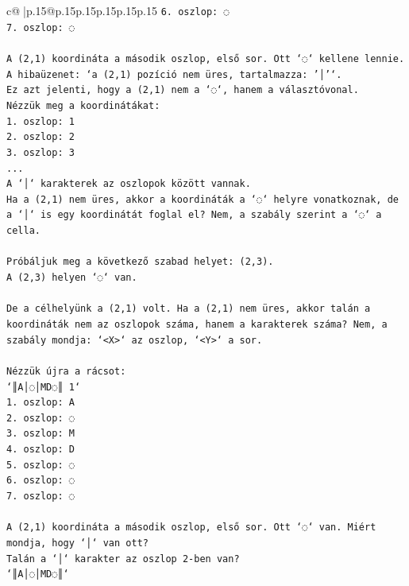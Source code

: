 \documentclass{article}
\begin{document}
{\begin{supertabular}{c@{$\;$}|p{.15\linewidth}@{}p{.15\linewidth}p{.15\linewidth}p{.15\linewidth}p{.15\linewidth}p{.15\linewidth}}
{{{\texttt{6. oszlop: ◌} \\
\texttt{7. oszlop: ◌} \\
\\ 
\texttt{A (2,1) koordináta a második oszlop, első sor. Ott `◌` kellene lennie.} \\
\texttt{A hibaüzenet: `a (2,1) pozíció nem üres, tartalmazza: '│'`.} \\
\texttt{Ez azt jelenti, hogy a (2,1) nem a `◌`, hanem a választóvonal.} \\
\texttt{Nézzük meg a koordinátákat:} \\
\texttt{1. oszlop: 1} \\
\texttt{2. oszlop: 2} \\
\texttt{3. oszlop: 3} \\
\texttt{...} \\
\texttt{A `│` karakterek az oszlopok között vannak.} \\
\texttt{Ha a (2,1) nem üres, akkor a koordináták a `◌` helyre vonatkoznak, de a `│` is egy koordinátát foglal el? Nem, a szabály szerint a `◌` a cella.} \\
\\ 
\texttt{Próbáljuk meg a következő szabad helyet: (2,3).} \\
\texttt{A (2,3) helyen `◌` van.} \\
\\ 
\texttt{De a célhelyünk a (2,1) volt. Ha a (2,1) nem üres, akkor talán a koordináták nem az oszlopok száma, hanem a karakterek száma? Nem, a szabály mondja: `<X>` az oszlop, `<Y>` a sor.} \\
\\ 
\texttt{Nézzük újra a rácsot:} \\
\texttt{`║A│◌│MD◌║ 1`} \\
\texttt{1. oszlop: A} \\
\texttt{2. oszlop: ◌} \\
\texttt{3. oszlop: M} \\
\texttt{4. oszlop: D} \\
\texttt{5. oszlop: ◌} \\
\texttt{6. oszlop: ◌} \\
\texttt{7. oszlop: ◌} \\
\\ 
\texttt{A (2,1) koordináta a második oszlop, első sor. Ott `◌` van. Miért mondja, hogy `│` van ott?} \\
\texttt{Talán a `│` karakter az oszlop 2{-}ben van?} \\
\texttt{`║A│◌│MD◌║`} \\
}}}
\end{supertabular}}
\end{document}
